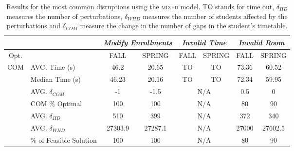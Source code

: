 \documentclass[twocolumn,natbib]{svjour3}          %
\begin{document}
\begin{table*}[!t]
\caption{Results for the most common disruptions using the \textsc{mixed} model. TO stands for time out, $\delta_{HD}$ measures the number of perturbations, $\delta_{WHD}$ measures the number of students affected by the perturbations and $\delta_{COM}$ measure the change in the number of gaps in the student’s timetable.}
\label{tab:recovery}
\centering
\begin{tabular}{cl|c|c|c|c|c|c|}
\cline{3-8}
                                           &                   & \multicolumn{2}{c|}{\textit{Modify Enrollments}}& \multicolumn{2}{c|}{\textit{Invalid  Time}}& \multicolumn{2}{c|}{\textit{Invalid  Room}} \\ \hline
\multicolumn{1}{|c|}{Opt.}         &                   & \textsc{FALL}                &  \textsc{SPRING}   & \textsc{FALL}                &  \textsc{SPRING}    & \textsc{FALL}                &  \textsc{SPRING}      \\ \hline
\multicolumn{1}{|c|}{\multirow{7}{*}{COM}} & AVG.  Time (s)  & 46.2 & 20.65          & TO &TO       &73.36 &60.52                \\ \cline{2-8} 
\multicolumn{1}{|c|}{}                     & Median Time (s)   & 46.23 & 20.16     & TO &TO     & 72.34 &  59.95                      \\ \cline{2-8} 
\multicolumn{1}{|c|}{}                     & AVG.  $\delta_{COM}$ & -1 & -1.5       & \multicolumn{2}{c|}{N/A}     & 0.5&        0           \\ \cline{2-8} 
\multicolumn{1}{|c|}{}                     & COM \% Optimal    & 100                 &    100  &\multicolumn{2}{c|}{N/A}   &80 & 90           \\ \cline{2-8} 
\multicolumn{1}{|c|}{}                     & AVG.  $\delta_{HD}$ &     510         &   399      & \multicolumn{2}{c|}{N/A}   & 372&   340   \\ \cline{2-8} 
\multicolumn{1}{|c|}{}                     & AVG. $\delta_{WHD}$ &27303.9& 27287.1   & \multicolumn{2}{c|}{N/A}                 & 27000&   27602.5         \\ \cline{2-8}
\multicolumn{1}{|c|}{}                     & \% of Feasible Solution & 100 & 100   &\multicolumn{2}{c|}{N/A}               & 80&   90            \\ \hline


\end{tabular}
\end{table*}
\end{document}
